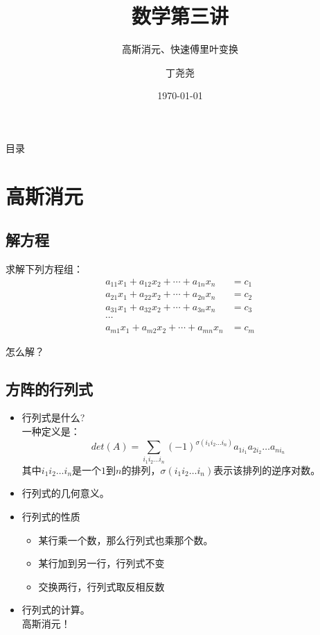 \documentclass[9pt]{beamer}
\title{数学第三讲}
\subtitle{高斯消元、快速傅里叶变换}
\author{丁尧尧}
\institute{上海交通大学}
\date{\today}
\begin{document}
	\maketitle
	\begin{frame}{目录}
		\tableofcontents
	\end{frame}
	
	\section{高斯消元}
		\subsection{解方程}
		\begin{frame}
			求解下列方程组：
			\begin{align*}
				a_{11}x_1 + a_{12}x_2 + \cdots + a_{1n}x_n & =  c_1 \\
				a_{21}x_1 + a_{22}x_2 + \cdots + a_{2n}x_n & =  c_2 \\
				a_{31}x_1 + a_{32}x_2 + \cdots + a_{3n}x_n & =  c_3 \\
				\cdots & \\
				a_{m1}x_1 + a_{m2}x_2 + \cdots + a_{mn}x_n & =  c_m 
			\end{align*}
			
			\pause
			怎么解？
		\end{frame}
		\subsection{方阵的行列式}
		\begin{frame}
			\begin{itemize}
			\item \pause 行列式是什么?	\\
				\pause 一种定义是：
				$$
					det(A) = \sum_{i_1i_2\dots i_n}(-1)^{\sigma(i_1i_2\dots i_n)}a_{1i_1}a_{2i_2}\dots a_{ni_n}
				$$
				其中$i_1i_2\dots i_n$是一个$1$到$n$的排列，$\sigma(i_1i_2\dots i_n)$表示该排列的逆序对数。
			\item \pause 行列式的几何意义。
			\item \pause 行列式的性质 \\
				\pause 
				\begin{itemize}
					\item \pause 某行乘一个数，那么行列式也乘那个数。
					\item \pause 某行加到另一行，行列式不变
					\item \pause 交换两行，行列式取反相反数
				\end{itemize}
			\item \pause 行列式的计算。\\
				  \pause 高斯消元！

			\end{itemize}
		\end{frame}
		
\end{document}
